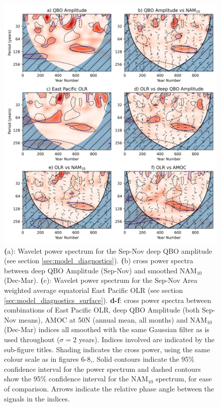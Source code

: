 \begin{figure}[h!]
\begin{center}
\noindent\includegraphics[width = 0.7\linewidth]{Figures/Figures-surface/OLR_wavelet.png}
\caption{\textbf(a): Wavelet power spectrum for the Sep-Nov deep QBO amplitude (see section \ref{sec:model_diagnostics}). \textbf(b) cross power spectra between deep QBO Amplitude (Sep-Nov) and smoothed NAM$_{10}$ (Dec-Mar). \textbf(c): Wavelet power spectrum for the Sep-Nov  Area weighted average equatorial East Pacific OLR (see section \ref{sec:model_diagnostics_surface}). \textbf{d-f}: cross power spectra between combinations of East Pacific OLR, deep QBO Amplitude (both Sep-Nov means), AMOC at 50N (annual mean, all months) and NAM$_{10}$ (Dec-Mar) indices all smoothed with the same Gaussian filter as is used throughout ($\sigma = 2$ years). Indices involved are indicated by the sub-figure titles. Shading indicates the cross power, using the same colour scale as in figures 6-8,. Solid contours indicate the 95\% confidence interval for the power spectrum and dashed contours show the 95\% confidence interval for the NAM$_{10}$ spectrum, for ease of comparison. Arrows  indicate the relative phase angle between the signals in the indices.}
\label{OLR_wavelet}
\end{center}
\end{figure}

